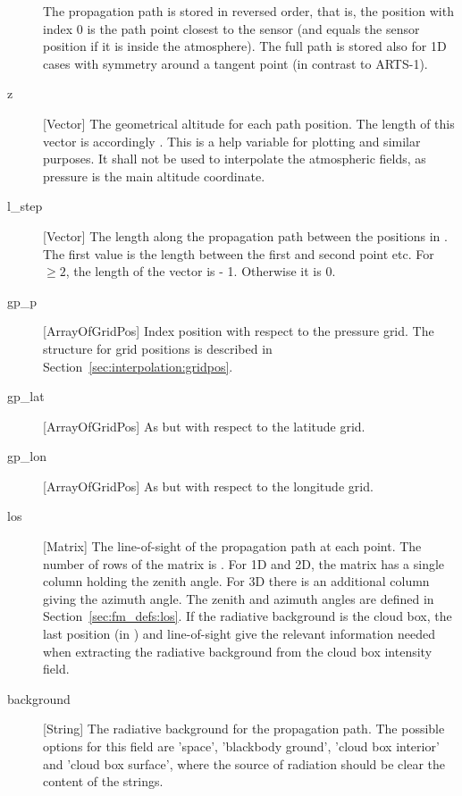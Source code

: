 \begin{description}
     The propagation path is stored in reversed order, that is, the
     position with index 0 is the path point closest to the sensor
     (and equals the sensor position if it is inside the atmosphere).
     The full path is stored also for 1D cases with symmetry around a
     tangent point (in contrast to ARTS-1). 
     
  \item[z] [Vector] The geometrical altitude for each path position. The
     length of this vector is accordingly . This is a help
     variable for plotting and similar purposes. It shall not be used to
     interpolate the atmospheric fields, as pressure is the main altitude
     coordinate.
     
   \item[l\_step] [Vector] The length along the propagation path
     between the positions in . The first value is the
     length between the first and second point etc. For 
     $\geq 2$, the length of the vector is  - 1.
     Otherwise it is 0.

   \item[gp\_p] [ArrayOfGridPos] Index position with respect to the
     pressure grid. The structure for grid positions is described in
     Section~\ref{sec:interpolation:gridpos}. 
     
   \item[gp\_lat] [ArrayOfGridPos] As  but with
     respect to the latitude grid.

   \item[gp\_lon] [ArrayOfGridPos] As  but with
     respect to the longitude grid.
     
   \item[los] [Matrix] The line-of-sight of the propagation path at
     each point. The number of rows of the matrix is .
     For 1D and 2D, the matrix has a single column holding the zenith
     angle. For 3D there is an additional column giving the azimuth
     angle. The zenith and azimuth angles are defined in
     Section~\ref{sec:fm_defs:los}. If the radiative background is the
     cloud box, the last position (in ) and
     line-of-sight give the relevant information needed when
     extracting the radiative background from the cloud box intensity
     field.
     
   \item[background] [String] The radiative background for the
     propagation path. The possible
     options for this field are 'space', 'blackbody ground', 'cloud
     box interior' and 'cloud box surface', where the source of
     radiation should be clear the content of the strings.
     

\end{description}
